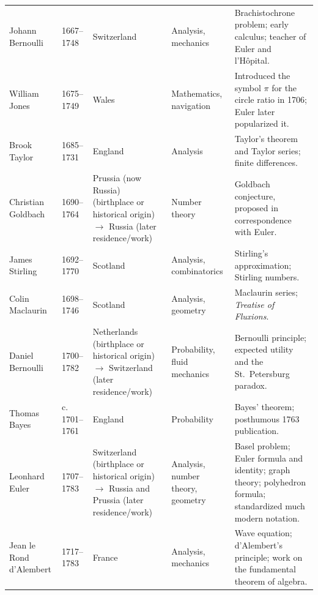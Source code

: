 {\begin{longtable}{@{}L{0.145\textwidth}L{0.09\textwidth}L{0.225\textwidth}L{0.14\textwidth}L{0.30\textwidth}@{}}
        Johann Bernoulli
        & 1667--1748
        & Switzerland
        & Analysis, mechanics
        & Brachistochrone problem; early calculus; teacher of Euler and
          l'Hôpital. \\

        William Jones
        & 1675--1749
        & Wales
        & Mathematics, navigation
        & Introduced the symbol $\pi$ for the circle ratio in 1706; Euler later
          popularized it. \\

        Brook Taylor
        & 1685--1731
        & England
        & Analysis
        & Taylor's theorem and Taylor series; finite differences. \\

        Christian Goldbach
        & 1690--1764
        & Prussia (now Russia) (birthplace or historical origin) \(\to\) Russia (later residence/work)
        & Number theory
        & Goldbach conjecture, proposed in correspondence with Euler. \\

        James Stirling
        & 1692--1770
        & Scotland
        & Analysis, combinatorics
        & Stirling's approximation; Stirling numbers. \\

        Colin Maclaurin
        & 1698--1746
        & Scotland
        & Analysis, geometry
        & Maclaurin series; \textit{Treatise of Fluxions}. \\

        Daniel Bernoulli
        & 1700--1782
        & Netherlands (birthplace or historical origin) \(\to\) Switzerland (later residence/work)
        & Probability, fluid mechanics
        & Bernoulli principle; expected utility and the St.\ Petersburg
          paradox. \\

        Thomas Bayes
        & c. 1701--1761
        & England
        & Probability
        & Bayes' theorem; posthumous 1763 publication. \\

        Leonhard Euler
        & 1707--1783
        & Switzerland (birthplace or historical origin) \(\to\) Russia and Prussia (later residence/work)
        & Analysis, number theory, geometry
        & Basel problem; Euler formula and identity; graph theory; polyhedron
          formula; standardized much modern notation. \\

        Jean le Rond d'Alembert
        & 1717--1783
        & France
        & Analysis, mechanics
        & Wave equation; d'Alembert's principle; work on the fundamental theorem
          of algebra. \\


\end{longtable}}

